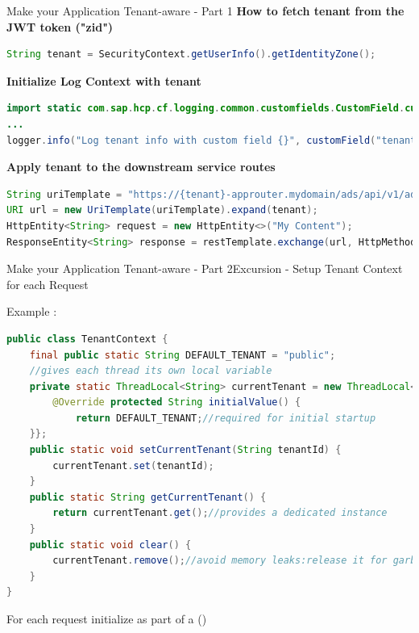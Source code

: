 \begin{frame}[fragile]{Make your Application Tenant-aware - Part 1}
\textbf{How to fetch tenant from the JWT token ("zid")}
\\\begin{lstlisting}[language=Java]
String tenant = SecurityContext.getUserInfo().getIdentityZone();
\end{lstlisting}
\vfill
\textbf{Initialize Log Context with tenant}
\\\begin{lstlisting}[language=Java]
import static com.sap.hcp.cf.logging.common.customfields.CustomField.customField;
...
logger.info("Log tenant info with custom field {}", customField("tenant", tenantValue"));
\end{lstlisting}
\vfill
\textbf{Apply tenant to the downstream service routes}
\\\begin{lstlisting}[language=Java]
String uriTemplate = "https://{tenant}-approuter.mydomain/ads/api/v1/ads/";
URI url = new UriTemplate(uriTemplate).expand(tenant);
HttpEntity<String> request = new HttpEntity<>("My Content");
ResponseEntity<String> response = restTemplate.exchange(url, HttpMethod.GET, request, String.class);
\end{lstlisting}
\end{frame}


\begin{frame}[t,fragile]{Make your Application Tenant-aware - Part 2}{Excursion - Setup Tenant Context for each Request}
\begin{block}{Example :}
\begin{lstlisting}[language=Java,belowskip=-3mm,aboveskip=0mm]
public class TenantContext {
    final public static String DEFAULT_TENANT = "public"; 
    //gives each thread its own local variable
    private static ThreadLocal<String> currentTenant = new ThreadLocal<String>() { 
        @Override protected String initialValue() {
            return DEFAULT_TENANT;//required for initial startup
    }};
    public static void setCurrentTenant(String tenantId) {
        currentTenant.set(tenantId);
    }
    public static String getCurrentTenant() {
        return currentTenant.get();//provides a dedicated instance 
    }
    public static void clear() {
        currentTenant.remove();//avoid memory leaks:release it for garbage coll.
    }
}
\end{lstlisting}
\end{block}
\scriptsize
For each request initialize  as part of a  ()
\end{frame}




